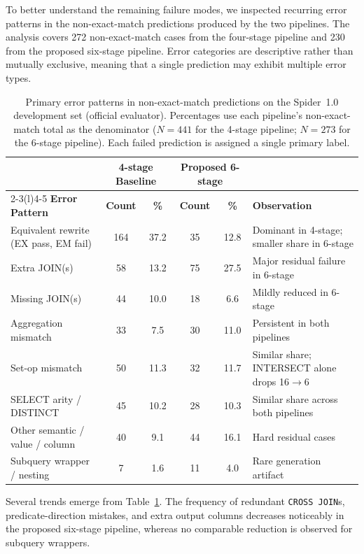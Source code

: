 \documentclass{svproc}
\begin{document}
To better understand the remaining failure modes, we inspected recurring error patterns in the non-exact-match predictions produced by the two pipelines. The analysis covers 272 non-exact-match cases from the four-stage pipeline and 230 from the proposed six-stage pipeline. Error categories are descriptive rather than mutually exclusive, meaning that a single prediction may exhibit multiple error types.

\begin{table}[t]
\caption{Primary error patterns in non-exact-match predictions on the Spider~1.0 development set (official evaluator). Percentages use each pipeline's non-exact-match total as the denominator ($N{=}441$ for the 4-stage pipeline; $N{=}273$ for the 6-stage pipeline). Each failed prediction is assigned a single primary label.}
\label{tab:errors}
\centering
\scriptsize
\begin{tabular*}{\textwidth}{@{\extracolsep{\fill}}p{3.4cm}ccccp{3.3cm}@{}}
\toprule
&
\multicolumn{2}{c}{\textbf{4-stage Baseline}} &
\multicolumn{2}{c}{\textbf{Proposed 6-stage}} &
\\
\cmidrule(lr){2-3}\cmidrule(l){4-5}
\textbf{Error Pattern} &
\textbf{Count} &
\textbf{\%} &
\textbf{Count} &
\textbf{\%} &
\textbf{Observation}
\\
\midrule
Equivalent rewrite (EX pass, EM fail) & 164 & 37.2 & 35 & 12.8 & Dominant in 4-stage; smaller share in 6-stage \\
Extra JOIN(s)                 & 58 & 13.2 & 75 & 27.5 & Major residual failure in 6-stage \\
Missing JOIN(s)               & 44 & 10.0 & 18 & 6.6 & Mildly reduced in 6-stage \\
Aggregation mismatch          & 33 & 7.5 & 30 & 11.0 & Persistent in both pipelines \\
Set-op mismatch               & 50 & 11.3 & 32 & 11.7 & Similar share; INTERSECT alone drops 16$\to$6 \\
SELECT arity / DISTINCT       & 45 & 10.2 & 28 & 10.3 & Similar share across both pipelines \\
Other semantic / value / column & 40 & 9.1 & 44 & 16.1 & Hard residual cases \\
Subquery wrapper / nesting    & 7 & 1.6 & 11 & 4.0 & Rare generation artifact \\
\bottomrule
\end{tabular*}
\end{table}


Several trends emerge from Table~\ref{tab:errors}. The frequency of redundant \texttt{CROSS JOIN}s, predicate-direction mistakes, and extra output columns decreases noticeably in the proposed six-stage pipeline, whereas no comparable reduction is observed for subquery wrappers.
\end{document}
